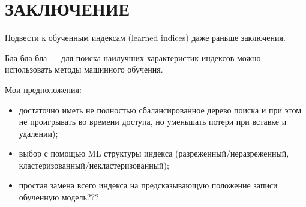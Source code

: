 \chapter*{ЗАКЛЮЧЕНИЕ}

Подвести к обученным индексам (learned indices) даже раньше заключения.

Бла-бла-бла --- для поиска наилучших характеристик индексов можно использовать
методы машинного обучения.

Мои предположения:

\begin{itemize}
    \item достаточно иметь не полностью сбалансированное дерево поиска и при
        этом не проигрывать во времени доступа, но уменьшать потери при вставке
        и удалении);
    \item выбор с помощью ML структуры индекса (разреженный/неразреженный,
        кластеризованный/некластеризованный);
    \item простая замена всего индекса на предсказывающую положение записи
        обученную модель???
\end{itemize}

